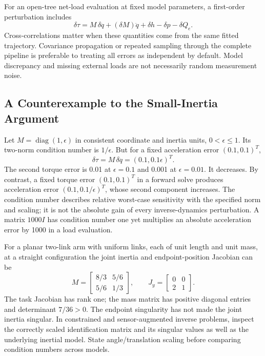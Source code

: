 For an open-tree net-load evaluation at fixed model parameters, a first-order
perturbation includes
\begin{equation}
 \delta\tau=M\,\delta\ddot q+(\delta M)\ddot q+
 \delta h-\delta p-\delta Q_e.
 \label{eq:inverse_uncertainty}
\end{equation}
Cross-correlations matter when these quantities come from the same fitted
trajectory. Covariance propagation or repeated sampling through the complete
pipeline is preferable to treating all errors as independent by default.
Model discrepancy and missing external loads are not necessarily random
measurement noise.

\subsection{A Counterexample to the Small-Inertia Argument}

Let $M=\operatorname{diag}(1,\epsilon)$ in consistent coordinate and inertia
units, $0<\epsilon\leq1$. Its two-norm condition number is $1/\epsilon$.
But for a fixed acceleration error $(0.1,0.1)^T$,
\begin{equation}
 \delta\tau=M\,\delta\ddot q=(0.1,0.1\epsilon)^T.
 \label{eq:inverse_error_counterexample}
\end{equation}
The second torque error is 0.01 at $\epsilon=0.1$ and 0.001 at
$\epsilon=0.01$. It decreases. By contrast, a fixed torque error
$(0.1,0.1)^T$ in a forward solve produces acceleration error
$(0.1,0.1/\epsilon)^T$, whose second component increases. The condition number
describes relative worst-case sensitivity with the specified norm and scaling;
it is not the absolute gain of every inverse-dynamics perturbation.
A matrix $1000I$ has condition number one yet multiplies an absolute
acceleration error by 1000 in a load evaluation.

For a planar two-link arm with uniform links, each of unit length and unit mass,
at a straight configuration the joint inertia and endpoint-position Jacobian
can be
\begin{equation}
 M=\begin{bmatrix}8/3&5/6\\5/6&1/3\end{bmatrix},
 \qquad J_y=\begin{bmatrix}0&0\\2&1\end{bmatrix}.
 \label{eq:straight_arm_inertia}
\end{equation}
The task Jacobian has rank one; the mass matrix has positive diagonal entries
and determinant $7/36>0$. The endpoint singularity has not made the joint
inertia singular. In constrained and sensor-augmented inverse problems, inspect
the correctly scaled identification matrix and its singular values as well as
the underlying inertial model. State angle/translation scaling before comparing
condition numbers across models.

